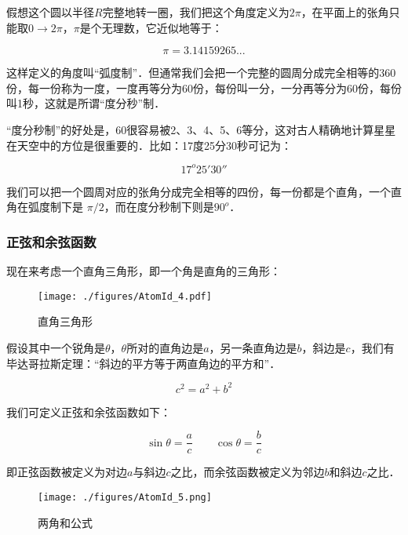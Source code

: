 假想这个圆以半径$R$完整地转一圈，我们把这个角度定义为$2 \pi$，在平面上的张角只能取$0 \to 2 \pi$，$\pi$是个无理数，它近似地等于：

\begin{equation}
\pi = 3.14159265 ...
\end{equation}

这样定义的角度叫“弧度制”．但通常我们会把一个完整的圆周分成完全相等的360份，每一份称为一度，一度再等分为60份，每份叫一分，一分再等分为60份，每份叫1秒，这就是所谓“度分秒”制．

“度分秒制”的好处是，60很容易被2、3、4、5、6等分，这对古人精确地计算星星在天空中的方位是很重要的．比如：17度25分30秒可记为：

\begin{equation}
17^o 25' 30''
\end{equation}

我们可以把一个圆周对应的张角分成完全相等的四份，每一份都是个直角，一个直角在弧度制下是 $\pi/2$，而在度分秒制下则是$90^o$．

\subsubsection{正弦和余弦函数}

现在来考虑一个直角三角形，即一个角是直角的三角形：

\begin{figure}[ht]
\centering
\texttt{[image: ./figures/AtomId\_4.pdf]}
\caption{直角三角形} \label{AtomId_fig4}
\end{figure}

假设其中一个锐角是$\theta$，$\theta$所对的直角边是$a$，另一条直角边是$b$，斜边是$c$，我们有毕达哥拉斯定理：“斜边的平方等于两直角边的平方和”．

\begin{equation}
c^2 = a^2 + b^2
\end{equation}

我们可定义正弦和余弦函数如下：

\begin{equation}
\sin \theta = \frac{a}{c} \qquad
\cos \theta = \frac{b}{c}
\end{equation}

即正弦函数被定义为对边$a$与斜边$c$之比，而余弦函数被定义为邻边$b$和斜边$c$之比．

\begin{figure}[ht]
\centering
\texttt{[image: ./figures/AtomId\_5.png]}
\caption{两角和公式} \label{AtomId_fig5}
\end{figure}

